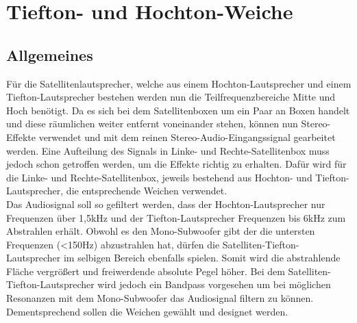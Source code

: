 \newpage
\section{Tiefton- und Hochton-Weiche}\label{sec:4.3}
\subsection{Allgemeines}\label{subsec:4.3.1}
Für die Satellitenlautsprecher, welche aus einem Hochton-Lautsprecher und einem Tiefton-Lautsprecher bestehen werden nun die Teilfrequenzbereiche Mitte und Hoch benötigt.
Da es sich bei dem Satellitenboxen um ein Paar an Boxen handelt und diese räumlichen weiter entfernt voneinander stehen, können nun Stereo-Effekte verwendet und mit dem reinen Stereo-Audio-Eingangssignal gearbeitet werden.
Eine Aufteilung des Signals in Linke- und Rechte-Satellitenbox muss jedoch schon getroffen werden, um die Effekte richtig zu erhalten.
Dafür wird für die Linke- und Rechte-Satellitenbox, jeweils bestehend aus Hochton- und Tiefton-Lautsprecher, die entsprechende Weichen verwendet.\\
Das Audiosignal soll so gefiltert werden, dass der Hochton-Lautsprecher nur Frequenzen über 1,5kHz und der Tiefton-Lautsprecher Frequenzen bis 6kHz zum Abstrahlen erhält.
Obwohl es den Mono-Subwoofer gibt der die untersten Frequenzen (<150Hz) abzustrahlen hat, dürfen die Satelliten-Tiefton-Lautsprecher im selbigen Bereich ebenfalls spielen.
Somit wird die abstrahlende Fläche vergrößert und freiwerdende absolute Pegel höher.
Bei dem Satelliten-Tiefton-Lautsprecher wird jedoch ein Bandpass vorgesehen um bei möglichen Resonanzen mit dem Mono-Subwoofer das Audiosignal filtern zu können.\\
Dementsprechend sollen die Weichen gewählt und designet werden.\\

